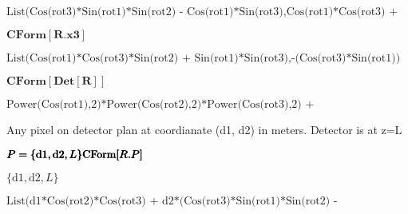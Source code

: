 \documentclass{article}
\begin{document}
\begin{doublespace}
\noindent\(\text{List(Cos(rot3)*Sin(rot1)*Sin(rot2) - Cos(rot1)*Sin(rot3),Cos(rot1)*Cos(rot3) + Sin(rot1)*Sin(rot2)*Sin(rot3),
   Cos(rot2)*Sin(rot1))}\)
\end{doublespace}

\begin{doublespace}
\noindent\(\pmb{\text{CForm}[R.\text{x3}]}\)
\end{doublespace}

\begin{doublespace}
\noindent\(\text{List(Cos(rot1)*Cos(rot3)*Sin(rot2) + Sin(rot1)*Sin(rot3),-(Cos(rot3)*Sin(rot1)) + Cos(rot1)*Sin(rot2)*Sin(rot3),
   Cos(rot1)*Cos(rot2))}\)
\end{doublespace}

\begin{doublespace}
\noindent\(\pmb{\text{CForm}[\text{Det}[R]]}\)
\end{doublespace}

\begin{doublespace}
\noindent\(\text{Power(Cos(rot1),2)*Power(Cos(rot2),2)*Power(Cos(rot3),2) +
   Power(Cos(rot2),2)*Power(Cos(rot3),2)*Power(Sin(rot1),2) +
   Power(Cos(rot1),2)*Power(Cos(rot3),2)*Power(Sin(rot2),2) +
   Power(Cos(rot3),2)*Power(Sin(rot1),2)*Power(Sin(rot2),2) +
   Power(Cos(rot1),2)*Power(Cos(rot2),2)*Power(Sin(rot3),2) +
   Power(Cos(rot2),2)*Power(Sin(rot1),2)*Power(Sin(rot3),2) +
   Power(Cos(rot1),2)*Power(Sin(rot2),2)*Power(Sin(rot3),2) +
   Power(Sin(rot1),2)*Power(Sin(rot2),2)*Power(Sin(rot3),2)}\)
\end{doublespace}

Any pixel on detector plan at coordianate (d1, d2) in meters. Detector is at z=L

\begin{doublespace}
\noindent\(\pmb{P=\{\text{d1},\text{d2},L\}}\\
\pmb{\text{CForm}[R.P]}\)
\end{doublespace}

\begin{doublespace}
\noindent\(\{\text{d1},\text{d2},L\}\)
\end{doublespace}

\begin{doublespace}
\noindent\(\text{List(d1*Cos(rot2)*Cos(rot3) + d2*(Cos(rot3)*Sin(rot1)*Sin(rot2) - Cos(rot1)*Sin(rot3)) +
    L*(Cos(rot1)*Cos(rot3)*Sin(rot2) + Sin(rot1)*Sin(rot3)),
   d1*Cos(rot2)*Sin(rot3) + L*(-(Cos(rot3)*Sin(rot1)) + Cos(rot1)*Sin(rot2)*Sin(rot3)) +
    d2*(Cos(rot1)*Cos(rot3) + Sin(rot1)*Sin(rot2)*Sin(rot3)),
   L*Cos(rot1)*Cos(rot2) + d2*Cos(rot2)*Sin(rot1) - d1*Sin(rot2))}\)
\end{doublespace}
\end{document}
